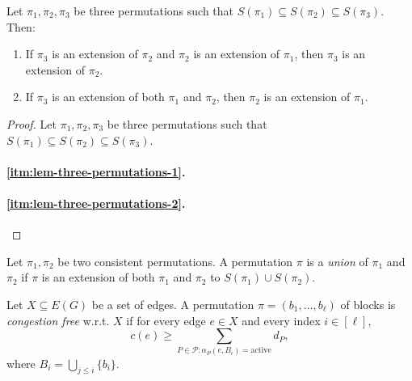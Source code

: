 \documentclass[fontsize=11pt,paper=a4]{book}
\begin{document}
\begin{lem}
Let \(\pi_1,\pi_2,\pi_3\) be three permutations such that \(S(\pi_1)\subseteq S(\pi_2)\subseteq S(\pi_3)\).
Then:

\begin{enumerate}
\item \label{itm:lem-three-permutations-1}
If \(\pi_3\) is an extension of \(\pi_2\) and \(\pi_2\) is an extension of \(\pi_1\), then \(\pi_3\) is an extension of \(\pi_2\).

\item \label{itm:lem-three-permutations-2}
If \(\pi_3\) is an extension of both \(\pi_1\) and \(\pi_2\), then \(\pi_2\) is an extension of \(\pi_1\).
\end{enumerate}
\label{orge4116d3}
\end{lem}

\begin{proof}
Let \(\pi_1,\pi_2,\pi_3\) be three permutations such that \(S(\pi_1)\subseteq S(\pi_2)\subseteq S(\pi_3)\).

\paragraph{\ref{itm:lem-three-permutations-1}.}

\paragraph{\ref{itm:lem-three-permutations-2}.}
\end{proof}

\begin{defn}
Let \(\pi_1,\pi_2\) be two consistent permutations.
A permutation \(\pi\) is a \emph{union} of \(\pi_1\) and \(\pi_2\) if \(\pi\) is an extension of both \(\pi_1\) and \(\pi_2\) to \(S(\pi_1)\cup S(\pi_2)\).
\label{org969cdf9}
\end{defn}

\begin{defn}
Let \(X\subseteq E(G)\) be a set of edges.
A permutation \(\pi=(b_1,\dots,b_{\ell})\) of blocks is \emph{congestion free} w.r.t. \(X\) if for every edge \(e\in X\) and every index \(i\in[\ell]\),
\begin{equation}
\label{eq:org33e793e}
c(e)\geq \sum_{P\in\mathcal{P}:\alpha_P(e,B_i)=\mathrm{active}}d_P,
\end{equation}
where \(B_i=\bigcup_{j\leq i}\{b_i\}\).
\label{org01237bf}
\end{defn}
\end{document}
